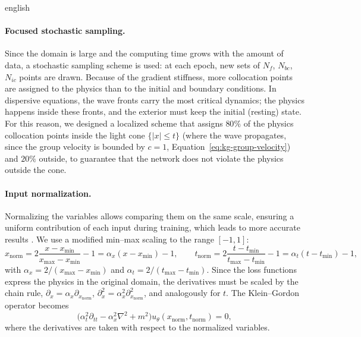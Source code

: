 \documentclass[12pt,letterpaper,twoside]{book}
\newcommand{\abs}[1]{\left\lvert #1 \right\rvert}
\begin{document}
\begin{hyphenrules}{english}
\paragraph{Focused stochastic sampling.}\label{subsec:sampling}
Since the domain is large and the computing time grows with the amount of data, a stochastic sampling
scheme is used: at each epoch, new sets of $N_f$, $N_{bc}$, $N_{ic}$ points are drawn. Because of the
gradient stiffness, more collocation points are assigned to the physics than to the initial and boundary
conditions. In dispersive equations, the wave fronts carry the most critical dynamics; the physics happens
inside these fronts, and the exterior must keep the initial (resting) state. For this reason, we designed
a localized scheme that assigns $80\%$ of the physics collocation points inside the light cone
$\{\abs{x}\le t\}$ (where the wave propagates, since the group velocity is bounded by $c=1$,
Equation~\eqref{eq:kg-group-velocity}) and $20\%$ outside, to guarantee that the network does not violate the physics
outside the cone.

\paragraph{Input normalization.}
Normalizing the variables allows comparing them on the same scale, ensuring a uniform contribution of each
input during training, which leads to more accurate results \cite{xu2025preprocessing}. We use a
modified min--max scaling to the range $[-1,1]$:
\begin{equation}
  x_{\mathrm{norm}}=2\frac{x-x_{\min}}{x_{\max}-x_{\min}}-1=\alpha_x(x-x_{\min})-1,\qquad
  t_{\mathrm{norm}}=2\frac{t-t_{\min}}{t_{\max}-t_{\min}}-1=\alpha_t(t-t_{\min})-1,
  \label{eq:normalization}
\end{equation}
with $\alpha_x=2/(x_{\max}-x_{\min})$ and $\alpha_t=2/(t_{\max}-t_{\min})$. Since the loss functions
express the physics in the original domain, the derivatives must be scaled by the chain rule,
$\partial_x=\alpha_x\partial_{x_{\mathrm{norm}}}$, $\partial_x^2=\alpha_x^2\partial^2_{x_{\mathrm{norm}}}$,
and analogously for $t$. The Klein--Gordon operator becomes
\begin{equation}
  \big(\alpha_t^2\partial_{tt}-\alpha_x^2\nabla^2+m^2\big)u_\theta(x_{\mathrm{norm}},t_{\mathrm{norm}})=0,
  \label{eq:kg-normalized}
\end{equation}
where the derivatives are taken with respect to the normalized variables.


\end{hyphenrules}
\end{document}
